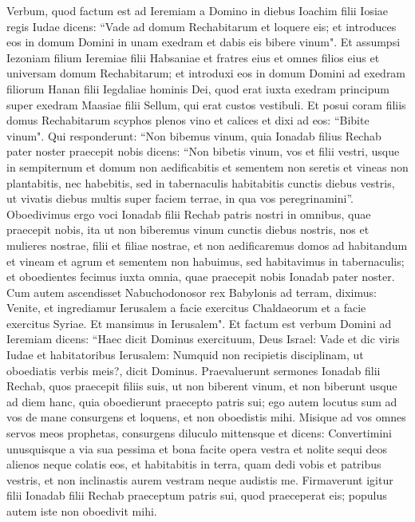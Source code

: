 \begin{biblechapter}  
\verse Verbum, quod factum est ad Ieremiam a Domino in diebus Ioachim filii Iosiae regis Iudae dicens: 
\verse “Vade ad domum Rechabitarum et loquere eis; et introduces eos in domum Domini in unam exedram et dabis eis bibere vinum".  
\verse Et assumpsi Iezoniam filium Ieremiae filii Habsaniae et fratres eius et omnes filios eius et universam domum Rechabitarum; 
\verse et introduxi eos in domum Domini ad exedram filiorum Hanan filii Iegdaliae hominis Dei, quod erat iuxta exedram principum super exedram Maasiae filii Sellum, qui erat custos vestibuli.  
\verse Et posui coram filiis domus Rechabitarum scyphos plenos vino et calices et dixi ad eos: “Bibite vinum". 
\verse Qui responderunt: “Non bibemus vinum, quia Ionadab filius Rechab pater noster praecepit nobis dicens: “Non bibetis vinum, vos et filii vestri, usque in sempiternum 
\verse et domum non aedificabitis et sementem non seretis et vineas non plantabitis, nec habebitis, sed in tabernaculis habitabitis cunctis diebus vestris, ut vivatis diebus multis super faciem terrae, in qua vos peregrinamini”. 
\verse Oboedivimus ergo voci Ionadab filii Rechab patris nostri in omnibus, quae praecepit nobis, ita ut non biberemus vinum cunctis diebus nostris, nos et mulieres nostrae, filii et filiae nostrae, 
\verse et non aedificaremus domos ad habitandum et vineam et agrum et sementem non habuimus, 
\verse sed habitavimus in tabernaculis; et oboedientes fecimus iuxta omnia, quae praecepit nobis Ionadab pater noster. 
\verse Cum autem ascendisset Nabuchodonosor rex Babylonis ad terram, diximus: Venite, et ingrediamur Ierusalem a facie exercitus Chaldaeorum et a facie exercitus Syriae. Et mansimus in Ierusalem". 
\verse Et factum est verbum Domini ad Ieremiam dicens: 
\verse “Haec dicit Dominus exercituum, Deus Israel: Vade et dic viris Iudae et habitatoribus Ierusalem: Numquid non recipietis disciplinam, ut oboediatis verbis meis?, dicit Dominus. 
\verse Praevaluerunt sermones Ionadab filii Rechab, quos praecepit filiis suis, ut non biberent vinum, et non biberunt usque ad diem hanc, quia oboedierunt praecepto patris sui; ego autem locutus sum ad vos de mane consurgens et loquens, et non oboedistis mihi. 
\verse Misique ad vos omnes servos meos prophetas, consurgens diluculo mittensque et dicens: Convertimini unusquisque a via sua pessima et bona facite opera vestra et nolite sequi deos alienos neque colatis eos, et habitabitis in terra, quam dedi vobis et patribus vestris, et non inclinastis aurem vestram neque audistis me. 
\verse Firmaverunt igitur filii Ionadab filii Rechab praeceptum patris sui, quod praeceperat eis; populus autem iste non oboedivit mihi. 

\end{biblechapter}
